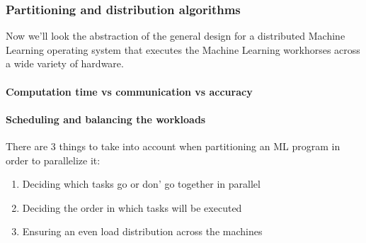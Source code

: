 %




\subsubsection{Partitioning and distribution algorithms}
Now we'll look the abstraction of the general design for a distributed Machine Learning operating system that executes the Machine Learning workhorses across a wide variety of hardware.


\paragraph{Computation time vs communication vs accuracy}


\paragraph{Scheduling and balancing the workloads}
There are 3 things to take into account when partitioning an ML program in order to parallelize it:\cite{Xing16}\\
\begin{enumerate}
	\item Deciding which tasks go or don' go together in parallel
	\item Deciding the order in which tasks will be executed
	\item Ensuring an even load distribution across the machines
\end{enumerate}


